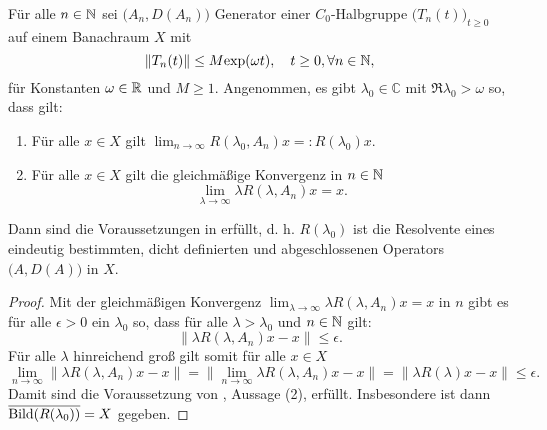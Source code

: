 \newpage
\begin{folg}\label{Trotter-Kato Bedingung (2)}
Für alle $n\in\mathbb{N}$ sei $\big(A_n, D(A_n)\big)$ Generator einer $C_0$-Halbgruppe $\big(T_n(t)\big)_{t\geq0}$ auf einem Banachraum $X$  mit 
\begin{equation*}
    \|T_n(t)\|\leq M\textnormal{exp}(\omega t),\quad t\geq0,\forall n\in \mathbb{N},
\end{equation*}
für Konstanten $\omega\in\mathbb{R}$ und $M\geq1$.
Angenommen, es gibt  $\lambda_0\in\mathbb C$ mit $\mathfrak R\lambda_0 >\omega$ so, dass gilt:
\begin{enumerate}
\item Für alle $x\in X$ gilt $\lim_{n\to\infty}R(\lambda_0, A_n)x =:R(\lambda_0)x$.
\item Für alle $x\in X$ gilt die gleichmäßige Konvergenz in $n\in\mathbb{N}$
\begin{equation*}
\lim_{\lambda\to\infty}\lambda R(\lambda, A_n)x=x.
\end{equation*}
\end{enumerate}
Dann sind die Voraussetzungen in  erfüllt, d. h. $R(\lambda_0)$ ist die Resolvente eines eindeutig bestimmten, dicht definierten und abgeschlossenen Operators $\big(A, D(A)\big)$ in $X$.
\end{folg}

\begin{proof}
Mit der gleichmäßigen Konvergenz $\lim_{\lambda\to\infty}\lambda R(\lambda, A_n)x=x$ in $n$ gibt es für alle $\epsilon>0$  ein $\lambda_0$ so, dass für alle $\lambda > \lambda_0$ und $n\in\mathbb{N}$ gilt:
\begin{equation*}
\|\lambda R(\lambda, A_n)x-x\|\leq \epsilon.
\end{equation*}
Für alle $\lambda$ hinreichend groß gilt somit für alle $x\in X$
\begin{equation*}
    \lim_{n\to\infty}\|\lambda R(\lambda, A_n)x-x\|=\|\lim_{n\to\infty}\lambda R(\lambda, A_n)x-x\|=\|\lambda R(\lambda)x-x\|\leq \epsilon.
\end{equation*}
Damit sind die Voraussetzung von , Aussage (2), erfüllt. Insbesondere ist dann $\overline{\textnormal{Bild}(R(\lambda_0))}=X$ gegeben.
\end{proof}



